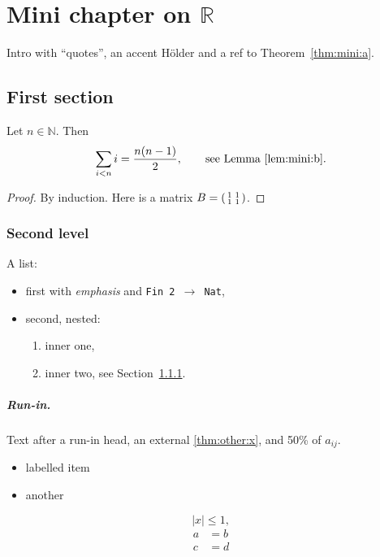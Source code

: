 \chapter{Mini chapter on $\mathbb{R}$}\label{chap:mini}

Intro with ``quotes'', an accent H\"older and a ref to Theorem~\ref{thm:mini:a}.

\section{First section}\label{sec:mini:first}

\begin{theorem}\label{thm:mini:a}
  \leanok
{}
Let $n\in\mathbb N$. Then
\[
  \sum_{i<n} i = \frac{n(n-1)}{2}, \qquad \text{see Lemma~\ref{lem:mini:b}.}
\]
\end{theorem}
\begin{proof}
  \leanok
By induction. Here is a matrix $B=\begin{psmallmatrix}1&1\\1&1\end{psmallmatrix}$.
\end{proof}

\subsection{Second level}\label{sec:mini:second}

\begin{lemma}\label{lem:mini:b}
A list:
\begin{itemize}
\item first with \emph{emphasis} and \texttt{Fin 2 $\to$ Nat},
\item second, nested:
  \begin{enumerate}
  \item inner one,
  \item inner two, see Section~\ref{sec:mini:second}.
  \end{enumerate}
\end{itemize}
\end{lemma}

\begin{remark}
\paragraph{Run-in.} Text after a run-in head, an external \ref{thm:other:x}, and 50\% of $a_{ij}$.
\begin{itemize}
\item[A.] labelled item
\item[B.] another
\end{itemize}
$$\Big|x\Big| \le 1,$$
\begin{align*}
a &= b \\
c &= d
\end{align*}
\end{remark}
